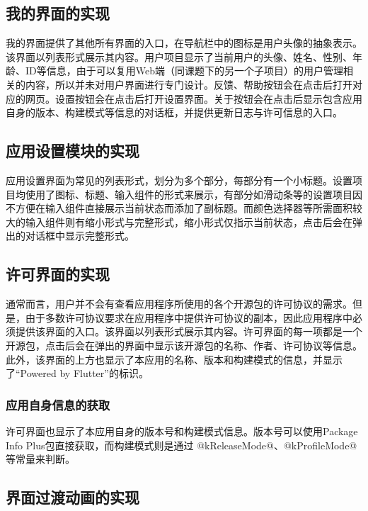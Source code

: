 \subsection{我的界面的实现}\label{subsec:me-ui}

我的界面提供了其他所有界面的入口，在导航栏中的图标是用户头像的抽象表示。该界面以列表形式展示其内容。用户项目显示了当前用户的头像、姓名、性别、年龄、ID等信息，由于可以复用Web端（同课题下的另一个子项目）的用户管理相关的内容，所以并未对用户界面进行专门设计。反馈、帮助按钮会在点击后打开对应的网页。设置按钮会在点击后打开设置界面。关于按钮会在点击后显示包含应用自身的版本、构建模式等信息的对话框，并提供更新日志与许可信息的入口。

\subsection{应用设置模块的实现}\label{subsec:settings}

应用设置界面为常见的列表形式，划分为多个部分，每部分有一个小标题。设置项目均使用了图标、标题、输入组件的形式来展示，有部分如滑动条等的设置项目因不方便在输入组件直接展示当前状态而添加了副标题。而颜色选择器等所需面积较大的输入组件则有缩小形式与完整形式，缩小形式仅指示当前状态，点击后会在弹出的对话框中显示完整形式。

\subsection{许可界面的实现}\label{subsec:license-ui}

通常而言，用户并不会有查看应用程序所使用的各个开源包的许可协议的需求。但是，由于多数许可协议要求在应用程序中提供许可协议的副本，因此应用程序中必须提供该界面的入口。该界面以列表形式展示其内容。许可界面的每一项都是一个开源包，点击后会在弹出的界面中显示该开源包的名称、作者、许可协议等信息。此外，该界面的上方也显示了本应用的名称、版本和构建模式的信息，并显示了“Powered by Flutter”的标识。

\subsubsection{应用自身信息的获取}\label{subsubsec:app-info}

许可界面也显示了本应用自身的版本号和构建模式信息。版本号可以使用Package Info Plus包直接获取，而构建模式则是通过 @kReleaseMode@、@kProfileMode@ 等常量来判断。

\subsection{界面过渡动画的实现}\label{subsec:transition-ui}


